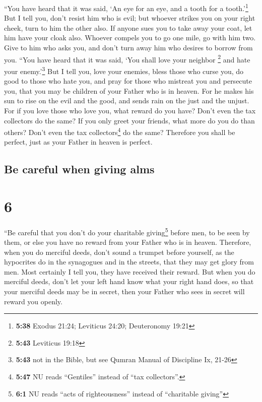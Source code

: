  ``You have heard that it was said, `An eye for an eye,
and a tooth for a tooth.'\footnote{\textbf{5:38} Exodus 21:24; Leviticus
  24:20; Deuteronomy 19:21}  But I tell you, don't resist
him who is evil; but whoever strikes you on your right cheek, turn to
him the other also.  If anyone sues you to take away your
coat, let him have your cloak also.  Whoever compels you
to go one mile, go with him two.  Give to him who asks
you, and don't turn away him who desires to borrow from you.
 ``You have heard that it was said, `You shall love your
neighbor \footnote{\textbf{5:43} Leviticus 19:18} and hate your
enemy.'\footnote{\textbf{5:43} not in the Bible, but see Qumran Manual
  of Discipline Ix, 21-26}  But I tell you, love your
enemies, bless those who curse you, do good to those who hate you, and
pray for those who mistreat you and persecute you,  that
you may be children of your Father who is in heaven. For he makes his
sun to rise on the evil and the good, and sends rain on the just and the
unjust.  For if you love those who love you, what reward
do you have? Don't even the tax collectors do the same? 
If you only greet your friends, what more do you do than others? Don't
even the tax collectors\footnote{\textbf{5:47} NU reads ``Gentiles''
  instead of ``tax collectors''.} do the same?  Therefore
you shall be perfect, just as your Father in heaven is perfect.

\hypertarget{be-careful-when-giving-alms}{%
\subsection{Be careful when giving
alms}\label{be-careful-when-giving-alms}}

\hypertarget{section-5}{%
\section{6}\label{section-5}}

 ``Be careful that you don't do your charitable
giving\footnote{\textbf{6:1} NU reads ``acts of righteousness'' instead
  of ``charitable giving''} before men, to be seen by them, or else you
have no reward from your Father who is in heaven. 
Therefore, when you do merciful deeds, don't sound a trumpet before
yourself, as the hypocrites do in the synagogues and in the streets,
that they may get glory from men. Most certainly I tell you, they have
received their reward.  But when you do merciful deeds,
don't let your left hand know what your right hand does, 
so that your merciful deeds may be in secret, then your Father who sees
in secret will reward you openly.


